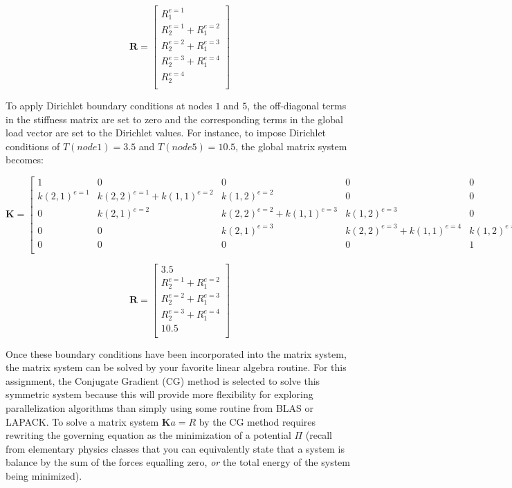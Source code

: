 \documentclass[10pt]{article}
\newcommand{\beq}{\begin{equation}}
\newcommand{\eeq}{\end{equation}}
\begin{document}
\beq
\textbf{R}=\begin{bmatrix}
R_1^{e=1} \\ R_2^{e=1}+R_1^{e=2}\\R_2^{e=2}+R_1^{e=3}\\R_2^{e=3}+R_1^{e=4}\\R_2^{e=4}\\
\end{bmatrix}
\eeq

To apply Dirichlet boundary conditions at nodes \(1\) and \(5\), the off-diagonal terms in the stiffness matrix are set to zero and the corresponding terms in the global load vector are set to the Dirichlet values. For instance, to impose Dirichlet conditions of \(T(node 1)=3.5\) and \(T(node 5) = 10.5\), the global matrix system becomes:

\beq
\textbf{K}=
\begin{bmatrix}
1 & 0 & 0 & 0 & 0\\
k(2, 1)^{e=1} & k(2, 2)^{e=1}+k(1, 1)^{e=2} & k(1, 2)^{e=2} & 0 & 0\\
0 & k(2, 1)^{e=2} & k(2, 2)^{e=2}+k(1, 1)^{e=3} & k(1, 2)^{e=3} & 0\\
0 & 0 & k(2, 1)^{e=3} & k(2, 2)^{e=3}+k(1, 1)^{e=4} & k(1, 2)^{e=4}\\
0 & 0 & 0 & 0 & 1\\
\end{bmatrix}
\eeq

\beq
\textbf{R}=\begin{bmatrix}
3.5\\ R_2^{e=1}+R_1^{e=2}\\R_2^{e=2}+R_1^{e=3}\\R_2^{e=3}+R_1^{e=4}\\10.5\\
\end{bmatrix}
\eeq

Once these boundary conditions have been incorporated into the matrix system, the matrix system can be solved by your favorite linear algebra routine. For this assignment, the Conjugate Gradient (CG) method is selected to solve this symmetric system because this will provide more flexibility for exploring parallelization algorithms than simply using some routine from BLAS or LAPACK. To solve a matrix system \(\textbf{K}a=R\) by the CG method requires rewriting the governing equation as the minimization of a potential \(\Pi\) (recall from elementary physics classes that you can equivalently state that a system is balance by the sum of the forces equalling zero, {\it or} the total energy of the system being minimized). 
\end{document}
